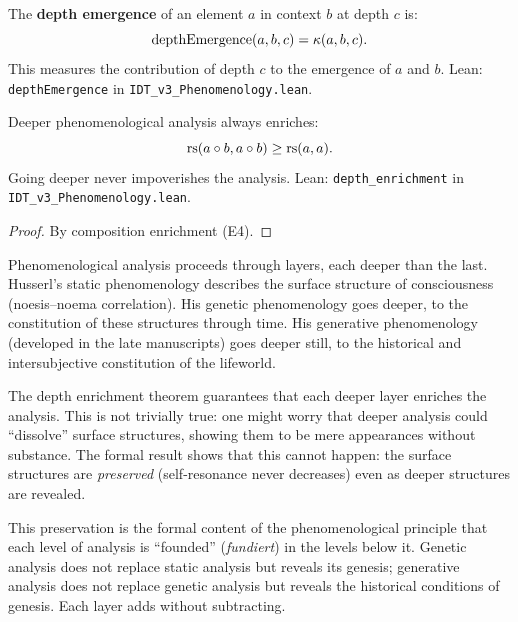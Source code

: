 \begin{theorem}
\label{thm:depth-emergence}
The \textbf{depth emergence} of an element $a$ in context $b$ at depth $c$ is:
\[
\mathrm{depthEmergence}(a, b, c) = \kappa(a, b, c).
\]
This measures the contribution of depth $c$ to the emergence of $a$ and $b$.
Lean: \texttt{depthEmergence} in \texttt{IDT\_v3\_Phenomenology.lean}.
\end{theorem}

\begin{theorem}
\label{thm:depth-enrichment}
Deeper phenomenological analysis always enriches:
\[
\mathrm{rs}(a \circ b, a \circ b) \geq \mathrm{rs}(a, a).
\]
Going deeper never impoverishes the analysis.
Lean: \texttt{depth\_enrichment} in \texttt{IDT\_v3\_Phenomenology.lean}.
\end{theorem}

\begin{proof}
By composition enrichment (E4).
\end{proof}

\begin{interpretation}
\label{interp:layers-phenom}
Phenomenological analysis proceeds through layers, each deeper than the
last.  Husserl's static phenomenology describes the surface structure of
consciousness (noesis--noema correlation).  His genetic phenomenology goes
deeper, to the constitution of these structures through time.  His
generative phenomenology (developed in the late manuscripts) goes deeper
still, to the historical and intersubjective constitution of the lifeworld.

The depth enrichment theorem guarantees that each deeper layer enriches
the analysis.  This is not trivially true: one might worry that deeper
analysis could ``dissolve'' surface structures, showing them to be mere
appearances without substance.  The formal result shows that this cannot
happen: the surface structures are \emph{preserved} (self-resonance never
decreases) even as deeper structures are revealed.

This preservation is the formal content of the phenomenological principle
that each level of analysis is ``founded'' (\textit{fundiert}) in the levels
below it.  Genetic analysis does not replace static analysis but reveals
its genesis; generative analysis does not replace genetic analysis but
reveals the historical conditions of genesis.  Each layer adds without
subtracting.
\end{interpretation}

